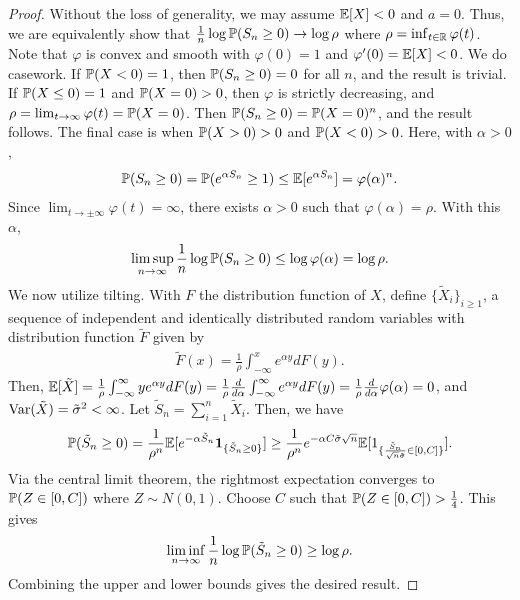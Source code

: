 \begin{proof}
    Without the loss of generality, we may assume $\mathbb{E}[X] < 0$ and $a = 0$. Thus, we are equivalently show that $\frac{1}{n} \log \mathbb{P}(S_{n} \geq 0) \to \log \rho$ where $\rho = \inf_{t \in \mathbb{R}} \varphi(t)$. Note that $\varphi$ is convex and smooth with $\varphi(0) = 1$ and $\varphi'(0) = \mathbb{E}[X] < 0$. We do casework. If $\mathbb{P}(X < 0) = 1$, then $\mathbb{P}(S_{n} \geq 0) = 0$ for all $n$, and the result is trivial. If $\mathbb{P}(X \leq 0) = 1$ and $\mathbb{P}(X = 0) > 0$, then $\varphi$ is strictly decreasing, and $\rho = \lim_{t \to \infty} \varphi(t) = \mathbb{P}(X = 0)$. Then $\mathbb{P}(S_{n} \geq 0) = \mathbb{P}(X = 0)^{n}$, and the result follows. The final case is when $\mathbb{P}(X > 0) > 0$ and $\mathbb{P}(X < 0) > 0$. Here, with $\alpha > 0$,
    \begin{align}
        \mathbb{P}(S_{n} \geq 0) = \mathbb{P}(e^{\alpha S_{n}} \geq 1) \leq \mathbb{E}[e^{\alpha S_{n}}] = \varphi(\alpha)^{n}.
    \end{align}
    Since $\lim_{t \to \pm \infty} \varphi(t) = \infty$, there exists $\alpha > 0$ such that $\varphi(\alpha) = \rho$. With this $\alpha$,
    \begin{align}
        \limsup_{n \to \infty} \frac{1}{n} \log \mathbb{P}(S_{n} \geq 0) \leq \log \varphi(\alpha) = \log \rho.
    \end{align}
    We now utilize tilting. With $F$ the distribution function of $X$, define $\{\tilde{X}_{i}\}_{i \geq 1}$, a sequence of independent and identically distributed random variables with distribution function $\tilde{F}$ given by
    \begin{align}
        \tilde{F}(x) = \frac{1}{\rho} \int_{-\infty}^{x} e^{\alpha y} dF(y).
    \end{align}
    Then, $\mathbb{E}[\tilde{X}] = \frac{1}{\rho} \int_{-\infty}^{\infty} y e^{\alpha y} dF(y) = \frac{1}{\rho} \frac{d}{d\alpha} \int_{-\infty}^{\infty} e^{\alpha y} dF(y) = \frac{1}{\rho} \frac{d}{d\alpha} \varphi(\alpha) = 0$, and $\operatorname{Var}(\tilde{X}) = \tilde{\sigma}^{2} < \infty$. Let $\tilde{S}_{n} = \sum_{i=1}^{n} \tilde{X}_{i}$. Then, we have
    \begin{align}
        \mathbb{P}(\tilde{S}_{n} \geq 0) = \frac{1}{\rho^{n}} \mathbb{E}[e^{-\alpha \tilde{S}_{n}} \textbf{1}_{\{\tilde{S}_{n} \geq 0\}}] \geq \frac{1}{\rho^{n}} e^{-\alpha C \tilde{\sigma} \sqrt{n}} \mathbb{E}[1_{\{\frac{\tilde{S}_{n}}{\sqrt{n} \tilde{\sigma}} \in [0,C]\}}].
    \end{align}
    Via the central limit theorem, the rightmost expectation converges to $\mathbb{P}(Z \in [0,C])$ where $Z \sim N(0,1)$. Choose $C$ such that $\mathbb{P}(Z \in [0,C]) > \frac{1}{4}$. This gives
    \begin{align}
        \liminf_{n \to \infty} \frac{1}{n} \log \mathbb{P}(\tilde{S}_{n} \geq 0) \geq \log \rho.
    \end{align}
    Combining the upper and lower bounds gives the desired result.
\end{proof}


